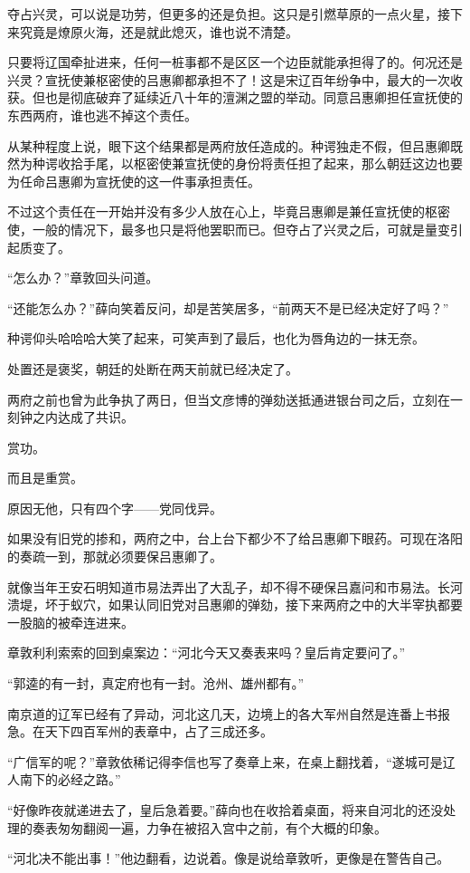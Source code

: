 夺占兴灵，可以说是功劳，但更多的还是负担。这只是引燃草原的一点火星，接下来究竟是燎原火海，还是就此熄灭，谁也说不清楚。

只要将辽国牵扯进来，任何一桩事都不是区区一个边臣就能承担得了的。何况还是兴灵？宣抚使兼枢密使的吕惠卿都承担不了！这是宋辽百年纷争中，最大的一次收获。但也是彻底破弃了延续近八十年的澶渊之盟的举动。同意吕惠卿担任宣抚使的东西两府，谁也逃不掉这个责任。

从某种程度上说，眼下这个结果都是两府放任造成的。种谔独走不假，但吕惠卿既然为种谔收拾手尾，以枢密使兼宣抚使的身份将责任担了起来，那么朝廷这边也要为任命吕惠卿为宣抚使的这一件事承担责任。

不过这个责任在一开始并没有多少人放在心上，毕竟吕惠卿是兼任宣抚使的枢密使，一般的情况下，最多也只是将他罢职而已。但夺占了兴灵之后，可就是量变引起质变了。

“怎么办？”章敦回头问道。

“还能怎么办？”薛向笑着反问，却是苦笑居多，“前两天不是已经决定好了吗？”

种谔仰头哈哈哈大笑了起来，可笑声到了最后，也化为唇角边的一抹无奈。

处置还是褒奖，朝廷的处断在两天前就已经决定了。

两府之前也曾为此争执了两日，但当文彦博的弹劾送抵通进银台司之后，立刻在一刻钟之内达成了共识。

赏功。

而且是重赏。

原因无他，只有四个字——党同伐异。

如果没有旧党的掺和，两府之中，台上台下都少不了给吕惠卿下眼药。可现在洛阳的奏疏一到，那就必须要保吕惠卿了。

就像当年王安石明知道市易法弄出了大乱子，却不得不硬保吕嘉问和市易法。长河溃堤，坏于蚁穴，如果认同旧党对吕惠卿的弹劾，接下来两府之中的大半宰执都要一股脑的被牵连进来。

章敦利利索索的回到桌案边：“河北今天又奏表来吗？皇后肯定要问了。”

“郭逵的有一封，真定府也有一封。沧州、雄州都有。”

南京道的辽军已经有了异动，河北这几天，边境上的各大军州自然是连番上书报急。在天下四百军州的表章中，占了三成还多。

“广信军的呢？”章敦依稀记得李信也写了奏章上来，在桌上翻找着，“遂城可是辽人南下的必经之路。”

“好像昨夜就递进去了，皇后急着要。”薛向也在收拾着桌面，将来自河北的还没处理的奏表匆匆翻阅一遍，力争在被招入宫中之前，有个大概的印象。

“河北决不能出事！”他边翻看，边说着。像是说给章敦听，更像是在警告自己。

